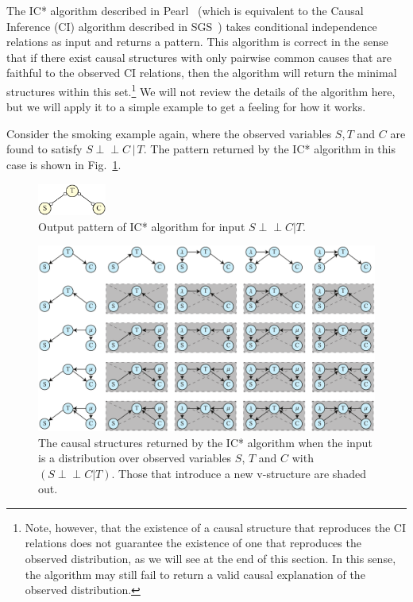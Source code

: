\documentclass[12pt,onecolumn,nofootinbib]{revtex4-2}
\def\indep{\perp\!\!\!\!\perp}
\begin{document}
The IC* algorithm described in Pearl~\cite{Pearl2009} (which is equivalent to the Causal Inference (CI) algorithm described in SGS~\cite{Spirtes2001}) takes conditional independence relations as input and returns a pattern.  This algorithm is correct in the sense that if there exist causal structures with only pairwise common causes that are
faithful to the observed CI relations, then the algorithm will return the minimal structures within this set.\footnote{Note, however, that the existence of a causal structure that reproduces the CI relations does not guarantee the existence of one that reproduces the observed distribution, as we will see at the end of this section. In this sense, the algorithm may still fail to return a valid causal explanation of the observed distribution.}  We will not review the details of the algorithm here, but we will apply it to a simple example to get a feeling for how it works.

Consider the smoking example again, where the observed variables $S,T$ and $C$ are found to satisfy $S\indep C\,|\,T$. The pattern returned by the IC* algorithm in this case is shown in Fig.~\ref{fig:smokeICstar}.

\begin{figure}[ht]
	\centering
	\includegraphics[width=0.2\textwidth]{smoke-pattern}
 \caption{Output pattern of IC* algorithm for input $S \indep C|T$.}
       \label{fig:smokeICstar}
\end{figure}

\begin{figure}
	\centering
	\includegraphics[width=\textwidth]{smoke-ic-all}
 \caption{The causal structures returned by the IC* algorithm when the input is a distribution over observed variables $S$, $T$ and $C$ with $(S \indep C|T)$. Those that introduce a new v-structure are shaded out.}
       \label{fig:smoke-icstar-all}
\end{figure}
\end{document}
